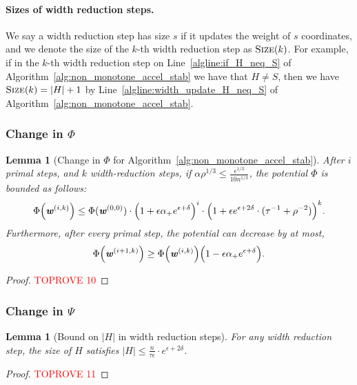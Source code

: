 \documentclass[11pt]{article}
\newtheorem{lemma}[theorem]{Lemma}
\let\originalleft\left
\let\originalright\right
\renewcommand{\left}{\mathopen{}\mathclose\bgroup\originalleft}
\renewcommand{\right}{\aftergroup\egroup\originalright}
\newcommand\ww{\boldsymbol{\mathit{w}}}
\begin{document}
\paragraph{Sizes of width reduction steps.}
We say a width reduction step has size $s$ if it updates the weight of $s$ coordinates, and we denote the size of the $k$-th width reduction step as $\textsc{Size}(k)$. For example, if in the $k$-th width reduction step on Line~\ref{algline:if_H_neq_S} of Algorithm~\ref{alg:non_monotone_accel_stab} we have that $H \neq S$, then we have $\textsc{Size}(k) = |H|+1$ by Line~\ref{algline:width_update_H_neq_S} of Algorithm~\ref{alg:non_monotone_accel_stab}.


\subsubsection{Change in \texorpdfstring{$\Phi$}{Phi}}



\begin{lemma}[Change in $\Phi$ for Algorithm~\ref{alg:non_monotone_accel_stab}]\label{lem:ChangePhiStab}
After $i$ primal steps, and $k$ width-reduction steps, if $\alpha \rho^{1/3}\leq \frac{\epsilon^{1/3}}{10 n^{1/3}}$, the potential $\Phi$ is bounded as follows:
\begin{align*}
\Phi\left(\ww^{(i,k)}\right) \leq \Phi(\ww^{(0,0)}) \cdot \left(1+\epsilon\alpha_+ e^{\epsilon+\delta} \right)^i \cdot \left( 1 + \epsilon e^{\epsilon+2\delta} \cdot (\tau^{-1} + \rho^{-2}) \right)^k.
\end{align*}
Furthermore, after every primal step, the potential can decrease by at most,
 \[
 \Phi\left(\ww^{(i+1,k)}\right) \geq  \Phi\left(\ww^{(i,k)}\right)\left(1-\epsilon\alpha_+ e^{\epsilon+\delta}\right).  
 \]
\end{lemma}
\begin{proof}\textcolor{red}{TOPROVE 10}\end{proof}



\subsubsection{Change in \texorpdfstring{$\Psi$}{Psi}}
\begin{lemma}[Bound on $|H|$ in width reduction steps]\label{lem:size_H}
For any width reduction step, the size of $H$ satisfies $|H| \leq \frac{n}{\tau \epsilon} \cdot e^{\epsilon+2\delta}$.
\end{lemma}
\begin{proof}\textcolor{red}{TOPROVE 11}\end{proof} 
\end{document}
